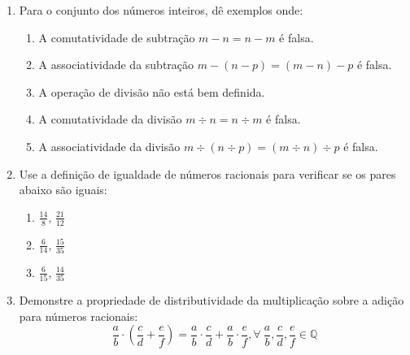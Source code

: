 \documentclass[a4paper,5pt]{amsbook}
\newcommand{\ds}{\displaystyle}
\begin{document}
\vspace{1cm}
\begin{enumerate}
    \vspace{0.5cm}
    \item Para o conjunto dos n\'umeros inteiros, d\^e exemplos onde:
        \begin{enumerate}
            \item A comutatividade de subtra\c{c}\~ao $m-n=n-m$ \'e falsa.
            \item A associatividade da subtra\c{c}\~ao $m-(n-p)=(m-n)-p$ \'e falsa.
            \item A opera\c{c}\~ao de divis\~ao n\~ao est\'a bem definida.
            \item A comutatividade da divis\~ao $m\div n=n\div m$ \'e falsa.
            \item A associatividade da divis\~ao $m\div (n\div p) = (m\div n)\div
            p$ \'e falsa.
        \end{enumerate}

    \vspace{0.5cm}
    \item Use a defini\c{c}\~ao de igualdade de n\'umeros racionais para verificar se
    os pares abaixo s\~ao iguais:
        \begin{enumerate}
            \item $\ds\frac{14}{8}$, $\ds\frac{21}{12}$
            \vspace{0.3cm}
            \item $\ds\frac{6}{14}$, $\ds\frac{15}{35}$
            \vspace{0.3cm}
            \item $\ds\frac{6}{15}$, $\ds\frac{14}{35}$
        \end{enumerate}

    \vspace{0.5cm}
    \item Demonstre a propriedade de distributividade da multiplica\c{c}\~ao sobre a
    adi\c{c}\~ao para n\'umeros racionais:
        \[\ds\frac{a}{b}\cdot\left(\frac{c}{d}+\frac{e}{f}\right) =
        \frac{a}{b}\cdot\frac{c}{d} + \frac{a}{b}\cdot\frac{e}{f}, \forall\
        \frac{a}{b},\frac{c}{d},\frac{e}{f}\in\mathbb{Q}\]
\end{enumerate}
\end{document}
